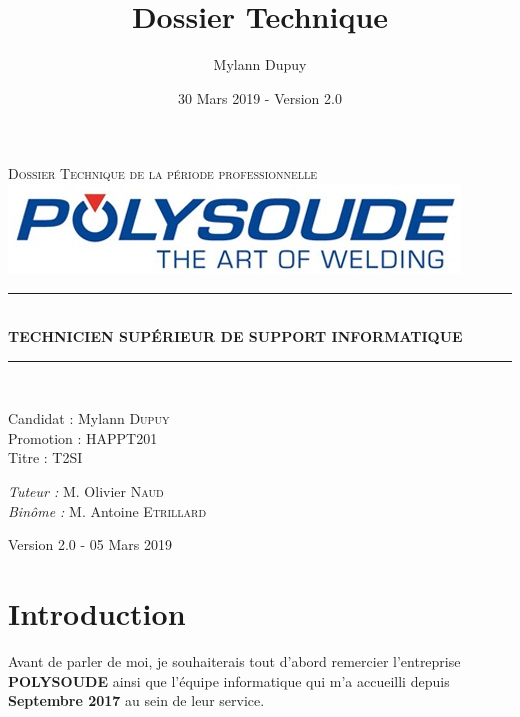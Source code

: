 \documentclass[11pt,a4paper,oneside]{article}
\author{Mylann Dupuy}
\title{Dossier Technique}
\date{30 Mars 2019 - Version 2.0}
\newcommand{\HRule}{\rule{\linewidth}{0.5mm}}
\begin{document}
\begin{titlepage}
  \begin{sffamily}
  \begin{center}

    \textsc{\LARGE Dossier Technique de la période professionnelle}\\[6.5cm]
    \includegraphics[scale=1]{Ressources/polysoude.jpg}
        \HRule \\[0.4cm]
        { \huge \bfseries TECHNICIEN SUPÉRIEUR DE SUPPORT INFORMATIQUE\\[0.4cm] }
        \HRule \\[6.5cm]

    \begin{minipage}{0.4\textwidth}
      \begin{flushleft} \large
        Candidat : Mylann \textsc{Dupuy}\\
        Promotion : HAPPT201\\
        Titre : T2SI
      \end{flushleft}
    \end{minipage}
    \begin{minipage}{0.5\textwidth}
      \begin{flushright} \large
        \emph{Tuteur :} M. Olivier \textsc{Naud}\\
        \emph{Binôme :} M. Antoine \textsc{Etrillard}\\
      \end{flushright}
    \end{minipage}

    \vfill

    {\large Version 2.0 - 05 Mars 2019}

  \end{center}
  \end{sffamily}
\end{titlepage}
\newpage

\tableofcontents
\newpage
\setcounter{page}{2}
\newpage

\section*{Introduction}
Avant de parler de moi, je souhaiterais tout d’abord remercier l’entreprise \textbf{POLYSOUDE} ainsi que l'équipe informatique qui m’a accueilli depuis \textbf{Septembre 2017} au sein de leur service.
\end{document}

